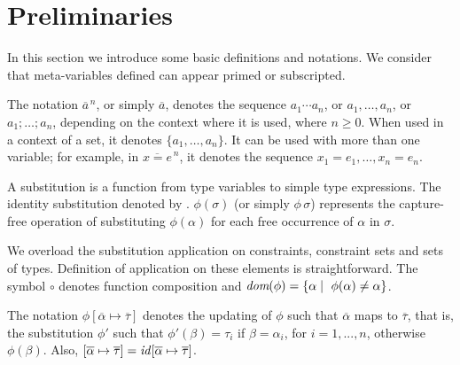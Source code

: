 \section{Preliminaries}\label{prelimirares}

In this section we introduce some basic definitions and notations. We
consider that meta-variables defined can appear primed or subscripted.


The notation $\overline{a}^{\,n}$, or simply $\overline{a}$, denotes
the sequence $a_1 \cdots a_n$, or $a_1, \ldots, a_n$, or
$a_1;\ldots;a_n$, depending on the context where it is used, where
$n\geq 0$. When used in a context of a set, it denotes
$\{a_1,\ldots,a_n\}$. It can be used with more than one variable; for
example, in $\overline{x = e}^{\,n}$, it denotes the sequence
$x_1=e_1, \ldots, x_n = e_n$.

A substitution is a function from type variables to simple type
expressions. The identity substitution denoted by \id. $\phi(\sigma)$
(or simply $\phi\,\sigma$) represents the capture-free operation of
substituting $\phi(\alpha)$ for each free occurrence of $\alpha$ in
$\sigma$.

We overload the substitution application on constraints, constraint
sets and sets of types. Definition of application on these elements is
straightforward. The symbol $\circ$ denotes function composition and
$\textit{dom}(\phi)=\{\alpha \mid\ \phi(\alpha) \neq \alpha\}$.

The notation $\phi[\overline{\alpha}\mapsto\overline{\tau}]$ denotes
the updating of $\phi$ such that $\overline{\alpha}$ maps to
$\overline{\tau}$, that is, the substitution $\phi'$ such that
$\phi'(\beta) = \tau_i$ if $\beta = \alpha_i$, for $i = 1,...,n$,
otherwise $\phi(\beta)$. Also, $[\overline{\alpha}\mapsto\overline{\tau}]
= \text{\it id\/}[\overline{\alpha}\mapsto\overline{\tau}]$.

